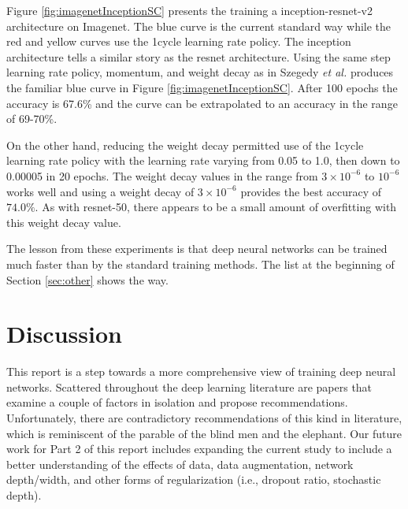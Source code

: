 \documentclass{article} %
\newcommand{\etal}{\emph{et al. }}
\begin{document}
Figure \ref{fig:imagenetInceptionSC} presents the training a inception-resnet-v2 architecture on Imagenet.  The blue curve is the current standard way while the red and yellow curves use the 1cycle learning rate policy.  The inception architecture tells a similar story as the resnet architecture.  Using the same step learning rate policy, momentum, and weight decay as in Szegedy \etal \cite{szegedy2017inception} produces the familiar blue curve in Figure \ref{fig:imagenetInceptionSC}.  After 100 epochs the accuracy is 67.6\% and the curve can be extrapolated to an accuracy in the range of 69-70\%.

On the other hand, reducing the weight decay permitted use of the 1cycle learning rate policy with the learning rate varying from 0.05 to 1.0, then down to 0.00005 in 20 epochs.  The weight decay values in the range from $3 \times 10^{-6}$ to $10^{-6}$ works well and  using a weight decay of $3 \times 10^{-6}$ provides the best accuracy of $ 74.0\%$.  As with resnet-50, there appears to be a small amount of overfitting with this weight decay value. 

The lesson from these experiments is that deep neural networks can be trained much faster than by the standard training methods.  The list at the beginning of Section \ref{sec:other} shows the way.




\section{Discussion}


This report is a step towards a more comprehensive view of training deep neural networks.  Scattered throughout the deep learning literature are papers that examine a couple of factors in isolation and propose recommendations.  Unfortunately, there are contradictory recommendations of this kind in literature, which is reminiscent of the parable of the blind men and the elephant. Our future work for Part 2 of this report includes expanding the current study to include a better understanding of the effects of data, data augmentation, network depth/width, and other forms of regularization (i.e., dropout ratio, stochastic depth).
\end{document}
